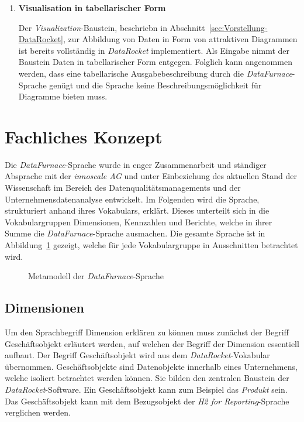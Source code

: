\documentclass[
  language=german, %
  type=bachelor,%
  ngerman
]{isthesis}
\begin{document}
\begin{content}
\begin{enumerate}
			\item \textbf{Visualisation in tabellarischer Form}

			Der \textit{Visualization}-Baustein, beschriebn in
			Abschnitt~\ref{sec:Vorstellung-DataRocket}, zur Abbildung von Daten in
			Form von attraktiven Diagrammen ist bereits vollständig in
			\textit{DataRocket} implementiert. Als Eingabe nimmt der Baustein Daten
			in tabellarischer Form entgegen. Folglich kann angenommen werden, dass
			eine tabellarische Ausgabebeschreibung durch die
			\textit{DataFurnace}-Sprache genügt und die Sprache keine
			Beschreibungsmöglichkeit für Diagramme bieten muss.



  \end{enumerate}


  \section{Fachliches Konzept}

  Die \textit{DataFurnace}-Sprache wurde in enger Zusammenarbeit und ständiger
  Absprache mit der \textit{innoscale AG} und unter Einbeziehung des
  aktuellen Stand der Wissenschaft im Bereich des Datenqualitätsmanagements und
  der Unternehmensdatenanalyse entwickelt. Im Folgenden wird die Sprache,
  strukturiert anhand ihres Vokabulars, erklärt. Dieses unterteilt sich in die
  Vokabulargruppen Dimensionen, Kennzahlen und Berichte, welche in ihrer Summe
  die \textit{DataFurnace}-Sprache ausmachen. Die gesamte Sprache ist in
  Abbildung~\ref{fig:language_spec-erm} gezeigt, welche für jede
  Vokabulargruppe in Ausschnitten betrachtet wird.


  \begin{figure}
    \resizebox{\columnwidth}{!}{}
    \caption{Metamodell der \textit{DataFurnace}-Sprache}\label{fig:language_spec-erm}
  \end{figure}

  \subsection{Dimensionen}\label{subsec:dimension}

	Um den Sprachbegriff Dimension erklären zu können muss zunächst der Begriff
	Geschäftsobjekt erläutert werden, auf welchen der Begriff der Dimension
	essentiell aufbaut. Der Begriff Geschäftsobjekt wird aus dem
	\textit{DataRocket}-Vokabular übernommen. Geschäftsobjekte sind Datenobjekte
	innerhalb eines Unternehmens, welche isoliert betrachtet werden können. Sie
	bilden den zentralen Baustein der \textit{DataRocket}-Software. Ein
	Geschäftsobjekt kann zum Beispiel das \textit{Produkt} sein.  Das
	Geschäftsobjekt kann mit dem Bezugsobjekt der \textit{H2 for
	Reporting}-Sprache verglichen werden.


\end{content}
\end{document}
